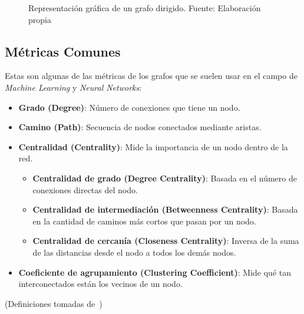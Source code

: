 \documentclass[11pt]{article} %
\begin{document}
\begin{figure}[H]
\centering
{}
\caption{Representación gráfica de un grafo dirigido. Fuente: Elaboración propia}
\end{figure}

\subsection{Métricas Comunes}
Estas son algunas de las métricas de los grafos que se suelen usar en el campo de \textit{Machine Learning} y \textit{Neural Networks}:
\begin{itemize}
    \item \textbf{Grado (Degree)}: Número de conexiones que tiene un nodo.
    \item \textbf{Camino (Path)}: Secuencia de nodos conectados mediante aristas.
    \item \textbf{Centralidad (Centrality)}: Mide la importancia de un nodo dentro de la red.
    \begin{itemize}
        \item \textbf{Centralidad de grado (Degree Centrality)}: Basada en el número de conexiones directas del nodo.
        \item \textbf{Centralidad de intermediación (Betweenness Centrality)}: Basada en la cantidad de caminos más cortos que pasan por un nodo.
        \item \textbf{Centralidad de cercanía (Closeness Centrality)}: Inversa de la suma de las distancias desde el nodo a todos los demás nodos.
    \end{itemize}
    \item \textbf{Coeficiente de agrupamiento (Clustering Coefficient)}: Mide qué tan interconectados están los vecinos de un nodo. 
\end{itemize}
\noindent (Definiciones tomadas de~\cite{mayo2025network})
\end{document}
